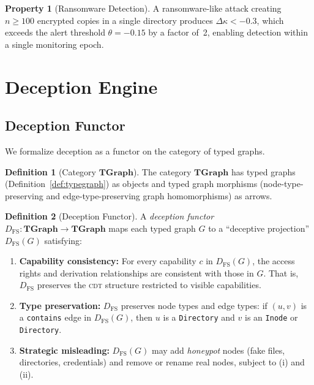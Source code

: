 \documentclass[11pt,a4paper]{article}
\theoremstyle{definition}
\newtheorem{definition}{Definition}[section]
\newtheorem{property}{Property}[section]
\theoremstyle{remark}
\newcommand{\CDT}{\textsc{cdt}}
\newcommand{\OR}{\ensuremath{\kappa}}  %
\newcommand{\cat}[1]{\ensuremath{\mathbf{#1}}}
\begin{document}
\begin{property}[Ransomware Detection]
\label{prop:ransomware}
A ransomware-like attack creating $n \geq 100$ encrypted copies in a
single directory produces $\Delta\OR < -0.3$, which exceeds the
alert threshold $\theta = -0.15$ by a factor of~2, enabling detection
within a single monitoring epoch.
\end{property}

\section{Deception Engine}
\label{sec:deception}

\subsection{Deception Functor}
\label{sec:deception-functor}

We formalize deception as a functor on the category of typed graphs.

\begin{definition}[Category $\cat{TGraph}$]
\label{def:cat-tgraph}
The category $\cat{TGraph}$ has typed graphs
(Definition~\ref{def:typegraph}) as objects and typed graph morphisms
(node-type-preserving and edge-type-preserving graph homomorphisms) as
arrows.
\end{definition}

\begin{definition}[Deception Functor]
\label{def:deception-functor}
A \emph{deception functor} $D_{\mathrm{FS}} : \cat{TGraph} \to
\cat{TGraph}$ maps each typed graph $G$ to a ``deceptive projection''
$D_{\mathrm{FS}}(G)$ satisfying:
\begin{enumerate}[label=(\roman*)]
\item \textbf{Capability consistency:} For every capability $c$ in
  $D_{\mathrm{FS}}(G)$, the access rights and derivation relationships
  are consistent with those in $G$. That is, $D_{\mathrm{FS}}$
  preserves the \CDT{} structure restricted to visible capabilities.

\item \textbf{Type preservation:} $D_{\mathrm{FS}}$ preserves node
  types and edge types: if $(u, v)$ is a \texttt{contains} edge in
  $D_{\mathrm{FS}}(G)$, then $u$ is a \texttt{Directory} and $v$ is an
  \texttt{Inode} or \texttt{Directory}.

\item \textbf{Strategic misleading:} $D_{\mathrm{FS}}(G)$ may add
  \emph{honeypot} nodes (fake files, directories, credentials) and
  remove or rename real nodes, subject to (i) and (ii).
\end{enumerate}
\end{definition}
\end{document}
